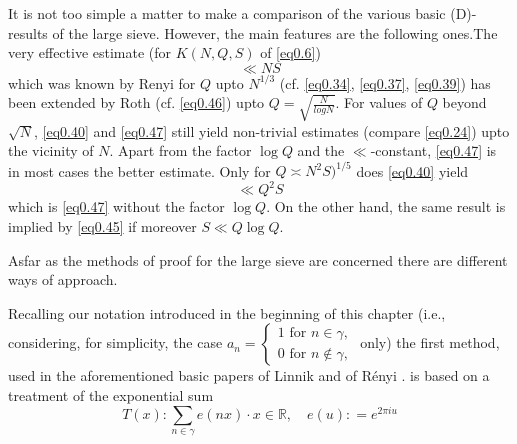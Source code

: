 It is not too simple a matter to make a comparison of the  various
basic (D)-results of the large sieve. However, the main features
are the following ones.The very effective estimate (for $K(N,Q,S)$ of
\eqref{eq0.6}) 
\begin{equation*}
\ll NS \tag{0.50}\label{eq0.50} 
\end{equation*}
which was known by Renyi for $Q$ upto $N^{1/3}$ (cf.  \eqref{eq0.34},
\eqref{eq0.37}, \eqref{eq0.39}) has been extended by Roth
(cf. \eqref{eq0.46}) upto  $Q=\sqrt{\frac{N}{log N}}$. For values of
$Q$ beyond $\sqrt{N}$, \eqref{eq0.40} and \eqref{eq0.47} still yield
non-trivial estimates (compare \eqref{eq0.24}) upto the vicinity of
$N$. Apart from the factor  $\log Q$ and
the $\ll$-constant, \eqref{eq0.47} is in most cases the  better
estimate. Only for $Q \asymp N^2S)^{1/5}$ does \eqref{eq0.40} yield  
\begin{equation*}
\ll Q^2 S \tag{0.51}\label{eq0.51} 
\end{equation*}
 which is \eqref{eq0.47} without the factor $\log Q$.  On the other
 hand, the same result is implied by \eqref{eq0.45} if moreover $ S
 \ll Q \log Q$. 
 
As\pageoriginale far as the methods of proof for the large sieve are
concerned there are different ways of approach. 
 
Recalling our notation introduced in the beginning of this chapter
(i.e., considering, for simplicity, the case 
 $ a_n=
 \begin{cases}
1  \text{ for } n \in \gamma ,\\
0  \text{ for } n \notin \gamma, 
 \end{cases}$ only) the first method, used in the aforementioned basic
 papers of Linnik \cite{key1} and of R\'enyi \cite{key2}. is based on
 a treatment of the exponential sum 
\begin{equation*}
T(x) : \sum _{n \in \gamma}e(nx)\cdot  x \in \mathbb{R}, \quad e (u): =
e^{2\pi iu} \tag{0.52}\label{eq0.52}  
\end{equation*}

